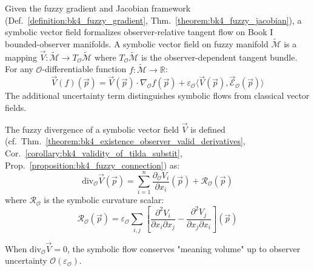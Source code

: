 \begin{definition}
\label{definition:bk4_symbolic_vector_field}
Given the fuzzy gradient and Jacobian framework (Def.~\ref{definition:bk4_fuzzy_gradient}, Thm.~\ref{theorem:bk4_fuzzy_jacobian}), a symbolic vector field formalizes observer-relative tangent flow on Book I bounded-observer manifolds.
A symbolic vector field on fuzzy manifold $\tilde{\mathcal{M}}$ is a mapping $\vec{V}: \tilde{\mathcal{M}} \to T_{\mathcal{O}}\tilde{\mathcal{M}}$ where $T_{\mathcal{O}}\tilde{\mathcal{M}}$ is the observer-dependent tangent bundle. For any $\mathcal{O}$-differentiable function $f: \tilde{\mathcal{M}} \to \mathbb{R}$:
\[
\vec{V}(f)(\vec{p}) = \vec{V}(\vec{p}) \cdot \nabla_{\mathcal{O}} f(\vec{p}) + \varepsilon_{\mathcal{O}} \langle \vec{V}(\vec{p}), \vec{\mathcal{E}}_{\mathcal{O}}(\vec{p}) \rangle
\]
The additional uncertainty term distinguishes symbolic flows from classical vector fields.
\end{definition}

\begin{theorem}
\label{theorem:bk4_fuzzy_divergence}
The fuzzy divergence of a symbolic vector field $\vec{V}$ is defined (cf.~Thm.~\ref{theorem:bk4_existence_observer_valid_derivatives}, Cor.~\ref{corollary:bk4_validity_of_tilda_substit}, Prop.~\ref{proposition:bk4_fuzzy_connection}) as:
\[
\text{div}_{\mathcal{O}} \vec{V}(\vec{p}) = \sum_{i=1}^n \frac{\partial_{\mathcal{O}} V_i}{\partial x_i}(\vec{p}) + \mathcal{R}_{\mathcal{O}}(\vec{p})
\]
where $\mathcal{R}_{\mathcal{O}}$ is the symbolic curvature scalar:
\[
\mathcal{R}_{\mathcal{O}}(\vec{p}) = \varepsilon_{\mathcal{O}} \sum_{i,j} \left[ \frac{\partial^2 V_i}{\partial x_i \partial x_j} - \frac{\partial^2 V_j}{\partial x_j \partial x_i} \right](\vec{p})
\]

When $\text{div}_{\mathcal{O}} \vec{V} = 0$, the symbolic flow conserves "meaning volume" up to observer uncertainty $\mathcal{O}(\varepsilon_{\mathcal{O}})$.
\end{theorem}

